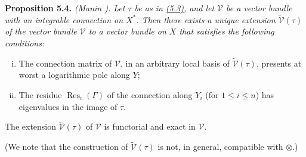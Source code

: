\documentclass{report}
\newenvironment{itenv}[1]
  {\phantomsection\par\medskip\noindent\textbf{#1.}\itshape}
  {\par\medskip}
\renewcommand{\cal}[1]{{\mathcal{#1}}}
\renewcommand{\leq}{\leqslant}
\DeclareMathOperator{\Res}{Res}
\newcommand{\oldpage}[1]{\marginpar{\footnotesize$\Big\vert$ \textit{p.~#1}}}
\begin{document}
\begin{itenv}{Proposition 5.4}
\label{II.5.4}
  \emph{(Manin \cite{19}).}
  Let $\tau$ be as in \hyperref[II.5.3]{(5.3)}, and let $\cal{V}$ be a vector bundle with an integrable connection on $X^*$.
  Then there exists a unique extension $\widetilde{\cal{V}}(\tau)$ of the vector bundle $\cal{V}$ to a vector bundle on $X$ that satisfies the following conditions:
  \begin{enumerate}[(i)]
    \item The connection matrix of $\cal{V}$, in an arbitrary local basis of $\widetilde{\cal{V}}(\tau)$, presents at worst a logarithmic pole along $Y$;
    \item The residue $\Res_i(\Gamma)$ of the connection along $Y_i$ (for $1\leq i\leq n$) has eigenvalues in the image of $\tau$.
  \end{enumerate}

  The extension $\widetilde{\cal{V}}(\tau)$ of $\cal{V}$ is functorial and exact in $\cal{V}$.

  (We note that the construction of $\widetilde{\cal{V}}(\tau)$ is not, in general, compatible with $\otimes$.)
\end{itenv}

\oldpage{95}
\end{document}
